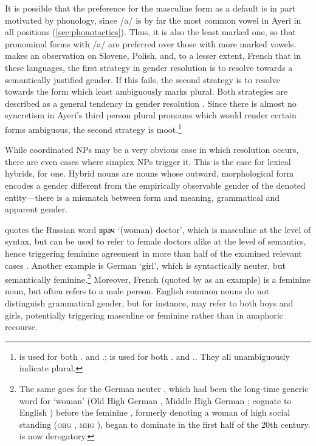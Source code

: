 It is possible that the preference for the masculine form as a default is in
part motivated by phonology, since /a/ is by far the most common vowel in Ayeri
in all positions (\autoref{sec:phonotactics}). Thus, it is also the least
marked one, so that pronominal forms with /a/ are preferred over those with
more marked vowels. \citet{corbett1983} makes an observation on Slovene,
Polish, and, to a lesser extent, French that in these languages, the first
strategy in gender resolution is to resolve towards a semantically justified
gender. If this fails, the second strategy is to resolve towards the form which
least ambiguously marks plural. Both strategies are described as a general
tendency in gender resolution \citep[205]{corbett1983}. Since there is almost
no syncretism in Ayeri's third person plural pronouns which would render
certain forms ambiguous, the second strategy is
moot.\footnote{ is used for both \TplF{}.\Aarg{} and
\TplI{}.\Aarg{};  is used for both
\TplF{}.\Gen{} and \TplI{}.\Gen{}. They all unambiguously indicate plural.}


While coordinated NPs may be a very obvious case in which resolution occurs,
there are even cases where simplex NPs trigger it. This is the case for lexical
hybrids, for one. Hybrid nouns are nouns whose outward, morphological form
encodes a gender different from the empirically observable gender of the
denoted entity---there is a mismatch between form and meaning, grammatical and
apparent gender.

\citet{corbett2006} quotes the Russian word {\FS врач}
 `(woman) doctor', which is masculine at the level of syntax, but can
be used to refer to female doctors alike at the level of semantics, hence
triggering feminine agreement in more than half of the examined relevant cases
\citep[158]{corbett2006}. Another example is German  `girl',
which is syntactically neuter, but semantically feminine.\footnote{The same
goes for the German neuter  \parencite[compare][165--166]
{fleischer2012}, which had been the long-time generic word for `woman' (Old
High German , Middle High German ; cognate to English
) before the feminine , formerly denoting a woman of high
social standing (\textsc{ohg} , \textsc{mhg} ), began to dominate in the
first half of the 20th century.  is now derogatory.} Moreover, French
 (quoted by \cite{wechsler2009} as an example) is a feminine
noun, but often refers to a male person. English common nouns do not
distinguish grammatical gender, but for instance,  may refer to
both boys and girls, potentially triggering masculine  or feminine
 rather than  in anaphoric recourse.

